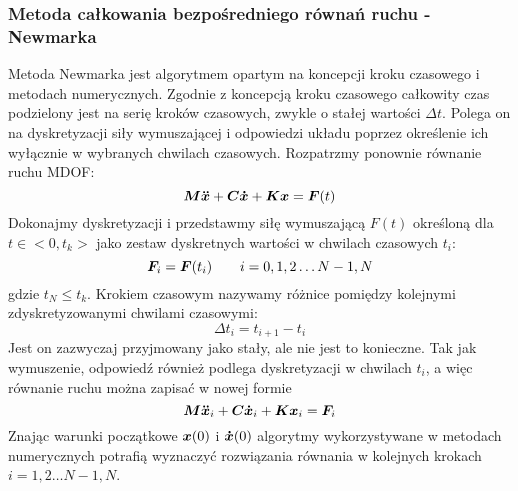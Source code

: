\subsubsection{Metoda całkowania bezpośredniego równań ruchu - Newmarka}
Metoda Newmarka jest algorytmem opartym na koncepcji kroku czasowego i metodach numerycznych. Zgodnie z koncepcją kroku czasowego całkowity czas podzielony jest na serię kroków czasowych, zwykle o stałej wartości $\Delta t$. Polega on na dyskretyzacji siły wymuszającej i odpowiedzi układu poprzez określenie ich wyłącznie w wybranych chwilach czasowych. Rozpatrzmy ponownie równanie ruchu MDOF:
\begin{equation}
	\bm{M}\bm{\ddot{x}}+\bm{C}\bm{\dot{x}}+\bm{K}\bm{x} = \bm{F}(t)
\end{equation} 
Dokonajmy dyskretyzacji i przedstawmy siłę wymuszającą $F(t)$ określoną dla $t\in<0,t_k>$ jako zestaw dyskretnych wartości w chwilach czasowych $t_i$:
\begin{equation}
	\bm{F}_i=\bm{F}(t_i) \qquad i = 0,1,2\dots N-1,N
\end{equation}
gdzie $t_N\leq t_k$. Krokiem czasowym nazywamy różnice pomiędzy kolejnymi zdyskretyzowanymi chwilami czasowymi:
\begin{equation}
	\Delta t_i = t_{i+1}-t_i
\end{equation}
Jest on zazwyczaj przyjmowany jako stały, ale nie jest to konieczne. Tak jak wymuszenie, odpowiedź również podlega dyskretyzacji w chwilach $t_i$, a więc równanie ruchu można zapisać w nowej formie
\begin{equation} \label{eq: motion_time_step}
	\bm{M}\bm{\ddot{x}}_i+\bm{C}\bm{\dot{x}}_i+\bm{K}\bm{x}_i = \bm{F}_i
\end{equation}
Znając warunki początkowe $\bm{x}(0)$ i $\bm{\dot{x}}(0)$ algorytmy wykorzystywane w metodach numerycznych potrafią wyznaczyć rozwiązania równania w kolejnych krokach $i = 1,2\dots N-1,N$. 

